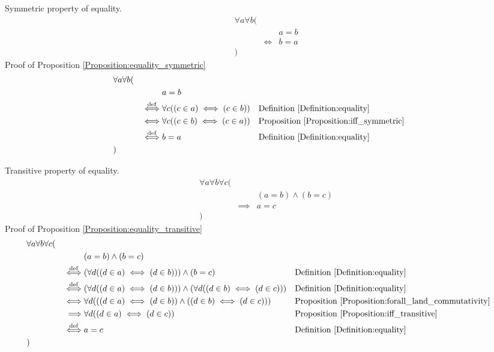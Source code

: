 \begin{prop}
\label{Proposition:equality_symmetric}
Symmetric property of equality.
\begin{align*}
& \forall a \forall b ( \\
& & & a = b \\
& & \iff & b = a \\
& )
\end{align*}
Proof of Proposition \ref{Proposition:equality_symmetric}
\begin{align*}
& \forall a \forall b ( \\
& & & a = b \\
& & \overset{\operatorname{def}}{\iff} & \forall c ((c \in a) \iff (c \in b))
& & \text{Definition \ref{Definition:equality}} \\
& & \iff & \forall c ((c \in b) \iff (c \in a))
& & \text{Proposition \ref{Proposition:iff_symmetric}} \\
& & \overset{\operatorname{def}}{\iff} & b = a
& & \text{Definition \ref{Definition:equality}} \\
& )
\end{align*}
\end{prop}

\begin{prop}
\label{Proposition:equality_transitive}
Transitive property of equality.
\begin{align*}
& \forall a \forall b \forall c ( \\
& & & (a = b) \land (b = c) \\
& & \implies & a = c \\
& )
\end{align*}
Proof of Proposition \ref{Proposition:equality_transitive}
\begin{align*}
& \forall a \forall b \forall c ( \\
& & & (a = b) \land (b = c) \\
& & \overset{\operatorname{def}}{\iff} & (\forall d ((d \in a) \iff (d \in b))) \land (b = c)
& & \text{Definition \ref{Definition:equality}} \\
& & \overset{\operatorname{def}}{\iff} & (\forall d ((d \in a) \iff (d \in b))) \land (\forall d ((d \in b) \iff (d \in c)))
& & \text{Definition \ref{Definition:equality}} \\
& & \iff & \forall d (((d \in a) \iff (d \in b)) \land ((d \in b) \iff (d \in c)))
& & \text{Proposition \ref{Proposition:forall_land_commutativity}} \\
& & \implies & \forall d ((d \in a) \iff (d \in c))
& & \text{Proposition \ref{Proposition:iff_transitive}} \\
& & \overset{\operatorname{def}}{\iff} & a = c
& & \text{Definition \ref{Definition:equality}} \\
& )
\end{align*}
\end{prop}

